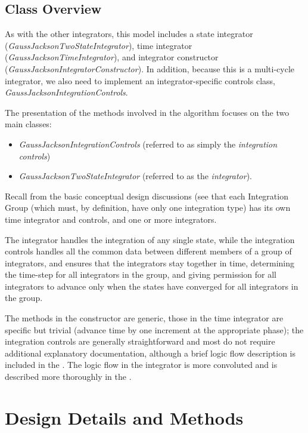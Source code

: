 \subsection{Class Overview}
As with the other integrators, this model includes a state integrator 
(\textit{GaussJacksonTwoStateIntegrator}), time integrator 
(\textit{GaussJacksonTimeIntegrator}), and integrator constructor 
(\textit{GaussJacksonIntegratorConstructor}).  In addition, because this is a 
multi-cycle integrator, we also need to implement an integrator-specific 
controls class, \textit{GaussJacksonIntegrationControls}.  
 
The presentation of the methods involved in the algorithm focuses on the two 
main classes:
\begin{itemize}
 \item \textit{GaussJacksonIntegrationControls} (referred to as simply the
\textit{integration controls})
\item \textit{GaussJacksonTwoStateIntegrator} (referred to as the
\textit{integrator}).
\end{itemize}


Recall from the basic conceptual design discussions (see  that each Integration Group (which
must, by definition, have only one integration type) has its own time
integrator and controls, and one or more integrators.

The integrator handles the integration of any
single state, while the integration controls handles all the common
data between different members of a group of integrators, and ensures
that the integrators stay together in time, determining the time-step
for all integrators in the group, and giving permission for all
integrators to advance only when the states have converged for all
integrators in the group.

The methods in the constructor are generic, those in the time integrator are 
specific but trivial (advance time by one
increment at the appropriate phase); the integration controls are
generally straightforward and most do not require additional
explanatory documentation, although a brief logic flow description is
included in the .
The logic flow in the integrator is more convoluted and is described more 
thoroughly in the
.


\section{Design Details and Methods}
